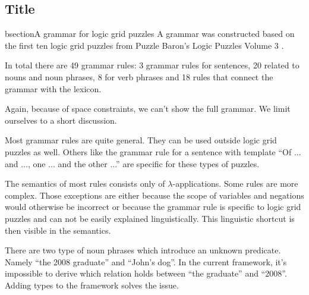 \subsection{Title}bsection{A grammar for logic grid puzzles}
A grammar was constructed based on the first ten logic grid puzzles from Puzzle Baron's Logic Puzzles Volume 3 \cite{logigrammen}.

In total there are 49 grammar rules: 3 grammar rules for sentences, 20 related to nouns and noun phrases, 8 for verb phrases and 18 rules that connect the grammar with the lexicon.

Again, because of space constraints, we can't show the full grammar. We limit ourselves to a short discussion.

Most grammar rules are quite general. They can be used outside logic grid puzzles as well. Others like the grammar rule for a sentence with template ``Of ... and ..., one ... and the other ...'' are specific for these types of puzzles.

The semantics of most rules consists only of $\lambda$-applications. Some rules are more complex. Those exceptions are either because the scope of variables and negations would otherwise be incorrect or because the grammar rule is specific to logic grid puzzles and can not be easily explained linguistically. This linguistic shortcut is then visible in the semantics.

There are two type of noun phrases which introduce an unknown predicate. Namely ``the 2008 graduate'' and ``John's dog''. In the current framework, it's impossible to derive which relation holds between ``the graduate'' and ``2008''. Adding types to the framework solves the issue.
